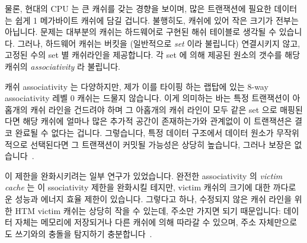 \fi

물론, 현대의 CPU 는 큰 캐쉬를 갖는 경향을 보이며, 많은 트랜잭션에 필요한
데이터는 쉽게 1 메가바이트 캐쉬에 담길 겁니다.
불행히도, 캐쉬에 있어 작은 크기가 전부는 아닙니다.
문제는 대부분의 캐쉬는 하드웨어로 구현된 해쉬 테이블로 생각될 수 있습니다.
그러나, 하드웨어 캐쉬는 버킷을 (일반적으로 \emph{set} 이라 불립니다) 연결시키지
않고, 고정된 수의 set 별 캐쉬라인을 제공합니다.
각 set 에 의해 제공된 원소의 갯수를 해당 캐쉬의 \emph{associativity} 라
불립니다.

\iffalse

Of course, modern CPUs tend to have large caches, and the data required
for many transactions would fit easily in a one-megabyte cache.
Unfortunately, with caches, sheer size is not all that matters.
The problem is that most caches
can be thought of hash tables implemented in hardware.
However, hardware caches do not chain their buckets (which are normally
called \emph{sets}), but rather
provide a fixed number of cachelines per set.
The number of elements provided for each set in a given cache
is termed that cache's \emph{associativity}.

\fi

캐쉬 associativity 는 다양하지만, 제가 이를 타이핑 하는 랩탑에 있는 8-way
associativity 레벨 0 캐쉬는 드물지 않습니다.
이게 의미하는 바는 특정 트랜잭션이 아홉개의 캐쉬 라인을 건드려야 하며 그
아홉개의 캐쉬 라인이 모두 같은 set 으로 매핑된다면 해당 캐쉬에 얼마나 많은
추가적 공간이 존재하는가와 관계없이 이 트랜잭션은 결코 완료될 수 없다는 겁니다.
그렇습니다, 특정 데이터 구조에서 데이터 원소가 무작위적으로 선택된다면 그
트랜잭션이 커밋될 가능성은 상당히 높습니다, 그러나 보장은
없습니다~\cite{PaulEMcKenney2012HTMCacheGeometry}.

\iffalse

Although cache associativity varies, the eight-way associativity of
the level-0 cache on the laptop I am typing this on is not unusual.
What this means is that if a given transaction needed to touch
nine cache lines, and if all nine cache lines mapped to the same
set, then that transaction cannot possibly complete, never mind how
many megabytes of additional space might be available in that cache.
Yes, given randomly selected data elements in a given data structure,
the probability of that transaction being able to commit is quite
high, but there can be no guarantee~\cite{PaulEMcKenney2012HTMCacheGeometry}.

\fi

이 제한을 완화시키려는 일부 연구가 있었습니다.
완전한 associativity 의 \emph{victim cache} 는 이 ssociativity 제한을 완화시킬
테지만, victim 캐쉬의 크기에 대한 까다로운 성능과 에너지 효율 제한이 있습니다.
그렇다고 하나, 수정되지 않은 캐쉬 라인을 위한 HTM victim 캐쉬는 상당히 작을 수
있는데, 주소만 가지면 되기 때문입니다:
데이터 자체는 메모리에 저장되거나 다른 캐쉬에 의해 따라갈 수 있으며, 주소
자체만으로도 쓰기와의 충돌을 탐지하기 충분합니다~\cite{RaviRajwar2012TSX}.

